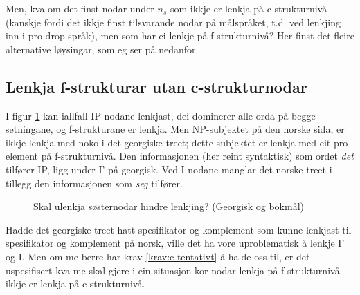\documentclass[12pt,a4paper,oneside,draft]{report}
\newcommand{\proj}[2]{\begin{tabular}{c}\footnotesize{#1}\\\normalsize{#2}\end{tabular}}
\newcommand{\ua}{\ensuremath{\uparrow}}
\newcommand{\da}{\ensuremath{\downarrow}}
\begin{document}
Men, kva om det finst nodar under $n_s$ som ikkje er lenkja på
c-strukturnivå (kanskje fordi det ikkje finst tilsvarande nodar på
målspråket, t.d. ved lenkjing inn i pro-drop-språk), men som har ei
lenkje på f-strukturnivå?  Her finst det fleire alternative løysingar,
som eg ser på nedanfor.

\subsection{Lenkja f-strukturar utan c-strukturnodar}
\label{sec-3.7.1}

\label{SEC:f-lenkje-utan-c-node}

I figur \ref{fig:gaiGo} kan iallfall IP-nodane lenkjast, dei dominerer
alle orda på begge setningane, og f-strukturane er lenkja. Men
NP-subjektet på den norske sida, er ikkje lenkja med noko i det
georgiske treet; dette subjektet er lenkja med eit pro-element på
f-strukturnivå. Den informasjonen (her reint syntaktisk) som ordet
\emph{det} tilfører IP, ligg under I' på georgisk. Ved I-nodane manglar
det norske treet i tillegg den informasjonen som \emph{seg} tilfører.

\begin{figure}[htp]
\centering
{}
\caption{Skal ulenkja søsternodar hindre lenkjing? (Georgisk og bokmål)}
 \label{fig:gaiGo}
\end{figure}

Hadde det georgiske treet hatt spesifikator og komplement som kunne
lenkjast til spesifikator og komplement på norsk, ville det ha vore
uproblematisk å lenkje I' og I. Men om me berre har krav
\ref{krav:c-tentativt} å halde oss til, er det uspesifisert kva me
skal gjere i ein situasjon kor nodar lenkja på f-strukturnivå ikkje er
lenkja på c-strukturnivå.
\end{document}

